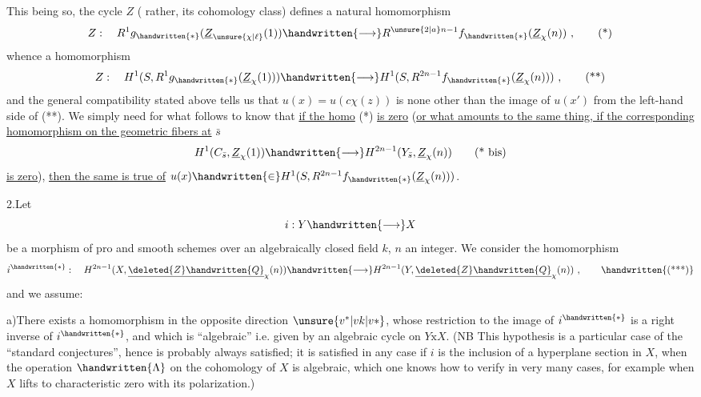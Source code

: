 This being so, the cycle $Z$ ( rather, its cohomology class) defines a natural homomorphism
\[
Z:\quad R^1g_{\handwritten{*}}(\underline{Z}_{\unsure{\chi|\ell}}(1))\handwritten{\longrightarrow}R^{\unsure{2|a}n-1}f_{\handwritten{*}}(\underline{Z}_{\chi}(n))\ ,\tag*{(*)}
\]
whence a homomorphism
\[
Z:\quad H^1(S,R^1g_{\handwritten{*}}(\underline{Z}_{\chi}(1)))\handwritten{\longrightarrow}H^1(S,R^{2n-1}f_{\handwritten{*}}(\underline{Z}_{\chi}(n)))\ ,\tag*{(**)}
\]
and the general compatibility stated above tells us that $u(x)=u(c\chi(z))$ is none other than the image of $u(x')$ from the left-hand side of  (**). We  simply need for what follows to know that \uline{if the homo} (*) \uline{is zero} (\uline{or what amounts to the same thing, if the corresponding homomorphism on the geometric fibers at} $\bar s$ 
\[
H^1(C_{\bar s},\underline{Z}_{\chi}(1))\handwritten{\longrightarrow}H^{2n-1}(Y_{\bar s},\underline{Z}_{\chi}(n))\tag*{(* bis)}
\]
\uline{is zero}), \uline{then the same is true of} $u(x)\handwritten{\in}H^1(S,R^{2n-1}f_{\handwritten{*}}(\underline{Z}_{\chi}(n)))$.

2.\quad Let
\[
i:Y\handwritten{\longrightarrow}X
\]
be a morphism of pro and smooth schemes over an algebraically closed field $k$, $n$ an integer. We  consider the homomorphism
\[
i^{\handwritten{*}}:\quad H^{2n-1}(X,\underline{\deleted{Z}\handwritten{Q}}_{\chi}(n))\handwritten{\longrightarrow}H^{2n-1}(Y,\underline{\deleted{Z}\handwritten{Q}}_{\chi}(n))\ ,\tag*{\handwritten{(***)}}
\]
and we assume:

a)\quad There exists a homomorphism in the opposite direction $\unsure{v^*|vk|v*}$, whose restriction to the image of $i^{\handwritten{*}}$ is a right inverse of $i^{\handwritten{*}}$, and which is ``algebraic'' i.e. given by an algebraic cycle on $Y\mathbin{\mathrm{x}}X$. (NB This hypothesis is a particular case of the ``standard conjectures'', hence is probably always satisfied; it is satisfied in any case if $i$ is the inclusion of a hyperplane section in $X$, when the operation $\handwritten{\Lambda}$ on  the cohomology of $X$ is algebraic,   which one knows how to verify in very many cases, for example when $X$ lifts to characteristic zero with its polarization.)
